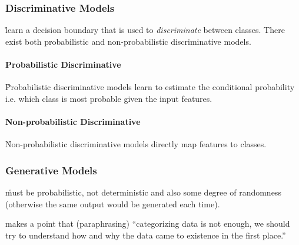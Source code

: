 \subsubsection{Discriminative Models}

\r{learn a decision boundary that is used to \textit{discriminate} between classes. There exist both probabilistic and non-probabilistic discriminative models.}

\paragraph{Probabilistic Discriminative}

\r{Probabilistic discriminative models learn to estimate the conditional probability i.e. which class is most probable given the input features.}

\paragraph{Non-probabilistic Discriminative}

\r{Non-probabilistic discriminative models directly map features to classes.}

\subsubsection{Generative Models}


\r{must be probabilistic, not deterministic and also some degree of randomness (otherwise the same output would be generated each time).}




\r{ makes a point that (paraphrasing) ``categorizing data is not enough, we should try to understand how and why the data came to existence in the first place.''}


